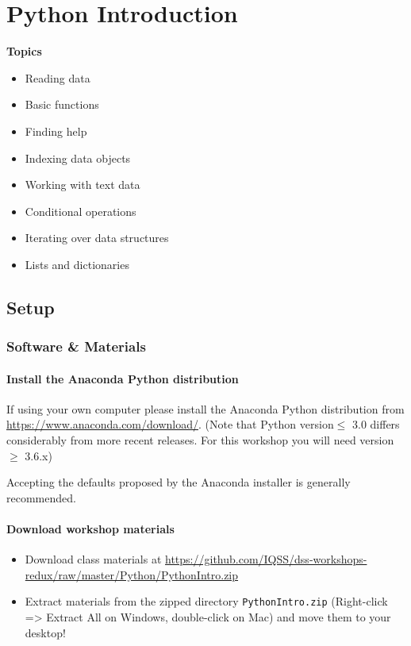 \documentclass[]{book}
\providecommand{\tightlist}{%
  \setlength{\itemsep}{0pt}\setlength{\parskip}{0pt}}
\begin{document}
\chapter{Python Introduction}\label{python-introduction}

\textbf{Topics}

\begin{itemize}
\tightlist
\item
  Reading data
\item
  Basic functions
\item
  Finding help
\item
  Indexing data objects
\item
  Working with text data
\item
  Conditional operations
\item
  Iterating over data structures
\item
  Lists and dictionaries
\end{itemize}

\section{Setup}\label{setup-4}

\subsection{Software \& Materials}\label{software-materials-4}

\subsubsection{Install the Anaconda Python
distribution}\label{install-the-anaconda-python-distribution}

If using your own computer please install the Anaconda Python
distribution from \url{https://www.anaconda.com/download/}. (Note that
Python version\(\leq\) 3.0 differs considerably from more recent
releases. For this workshop you will need version\(\geq\) 3.6.x)

Accepting the defaults proposed by the Anaconda installer is generally
recommended.

\subsubsection{Download workshop
materials}\label{download-workshop-materials}

\begin{itemize}
\tightlist
\item
  Download class materials at
  \url{https://github.com/IQSS/dss-workshops-redux/raw/master/Python/PythonIntro.zip}
\item
  Extract materials from the zipped directory \texttt{PythonIntro.zip}
  (Right-click =\textgreater{} Extract All on Windows, double-click on
  Mac) and move them to your desktop!
\end{itemize}
\end{document}

